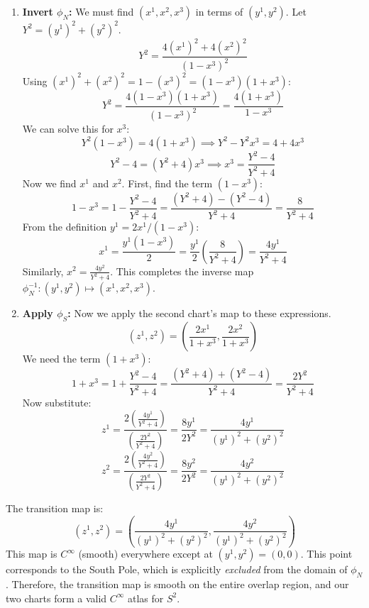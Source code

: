 \documentclass[11pt, a4paper]{report}
\begin{document}
\begin{enumerate}
    \item \textbf{Invert $\phi_N$:} We must find $(x^1, x^2, x^3)$ in terms of $(y^1, y^2)$.
    Let $Y^2 = (y^1)^2 + (y^2)^2$.
    \[
        Y^2 = \frac{4(x^1)^2 + 4(x^2)^2}{(1-x^3)^2}
    \]
    Using $(x^1)^2 + (x^2)^2 = 1 - (x^3)^2 = (1-x^3)(1+x^3)$:
    \[
        Y^2 = \frac{4(1-x^3)(1+x^3)}{(1-x^3)^2} = \frac{4(1+x^3)}{1-x^3}
    \]
    We can solve this for $x^3$:
    \[
        Y^2(1-x^3) = 4(1+x^3) \implies Y^2 - Y^2 x^3 = 4 + 4x^3
    \]
    \[
        Y^2 - 4 = (Y^2 + 4)x^3 \implies x^3 = \frac{Y^2 - 4}{Y^2 + 4}
    \]
    Now we find $x^1$ and $x^2$. First, find the term $(1-x^3)$:
    \[
        1 - x^3 = 1 - \frac{Y^2 - 4}{Y^2 + 4} = \frac{(Y^2 + 4) - (Y^2 - 4)}{Y^2 + 4} = \frac{8}{Y^2 + 4}
    \]
    From the definition $y^1 = 2x^1 / (1-x^3)$:
    \[
        x^1 = \frac{y^1 (1-x^3)}{2} = \frac{y^1}{2} \left( \frac{8}{Y^2 + 4} \right) = \frac{4y^1}{Y^2 + 4}
    \]
    Similarly, $x^2 = \frac{4y^2}{Y^2 + 4}$.
    This completes the inverse map $\phi_N^{-1}: (y^1, y^2) \mapsto (x^1, x^2, x^3)$.

    \item \textbf{Apply $\phi_S$:} Now we apply the second chart's map to these expressions.
    \[
        (z^1, z^2) = \left( \frac{2x^1}{1+x^3}, \frac{2x^2}{1+x^3} \right)
    \]
    We need the term $(1+x^3)$:
    \[
        1 + x^3 = 1 + \frac{Y^2 - 4}{Y^2 + 4} = \frac{(Y^2 + 4) + (Y^2 - 4)}{Y^2 + 4} = \frac{2Y^2}{Y^2 + 4}
    \]
    Now substitute:
    \[
        z^1 = \frac{2 \left( \frac{4y^1}{Y^2 + 4} \right)}{ \left( \frac{2Y^2}{Y^2 + 4} \right) } = \frac{8y^1}{2Y^2} = \frac{4y^1}{(y^1)^2 + (y^2)^2}
    \]
    \[
        z^2 = \frac{2 \left( \frac{4y^2}{Y^2 + 4} \right)}{ \left( \frac{2Y^2}{Y^2 + 4} \right) } = \frac{8y^2}{2Y^2} = \frac{4y^2}{(y^1)^2 + (y^2)^2}
    \]
\end{enumerate}
The transition map is:
\begin{equation}
    (z^1, z^2) = \left( \frac{4y^1}{(y^1)^2 + (y^2)^2}, \frac{4y^2}{(y^1)^2 + (y^2)^2} \right)
\end{equation}
This map is $C^\infty$ (smooth) everywhere except at $(y^1, y^2) = (0,0)$. This point corresponds to the South Pole, which is explicitly \emph{excluded} from the domain of $\phi_N$. Therefore, the transition map is smooth on the entire overlap region, and our two charts form a valid $C^\infty$ atlas for $S^2$.
\end{document}
